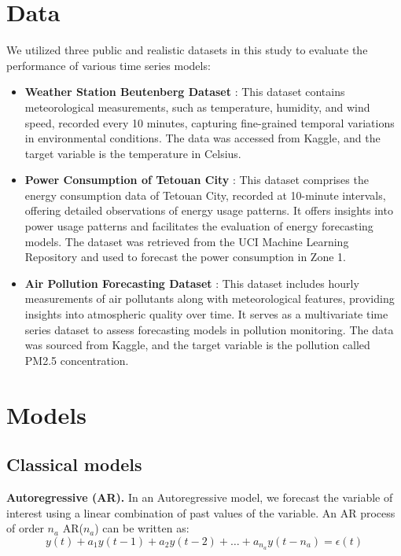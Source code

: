 \documentclass{scrartcl}
\begin{document}
\section{Data}
We utilized three public and realistic datasets in this study to evaluate the performance of various time series models:
\begin{itemize}
    \item \textbf{Weather Station Beutenberg Dataset} \cite{weather2020}: This dataset contains meteorological measurements, such as temperature, humidity, and wind speed, recorded every 10 minutes, capturing fine-grained temporal variations in environmental conditions. The data was accessed from Kaggle, and the target variable is the temperature in Celsius. 
    
    \item \textbf{Power Consumption of Tetouan City} \cite{power_consumption_of_tetouan_city_849}: This dataset comprises the energy consumption data of Tetouan City, recorded at 10-minute intervals,  offering detailed observations of energy usage patterns. It offers insights into power usage patterns and facilitates the evaluation of energy forecasting models. The dataset was retrieved from the UCI Machine Learning Repository and used to forecast the power consumption in Zone 1.
    
    \item \textbf{Air Pollution Forecasting Dataset} \cite{kaggle_lstm_dataset}: This dataset includes hourly measurements of air pollutants along with meteorological features, providing insights into atmospheric quality over time. It serves as a multivariate time series dataset to assess forecasting models in pollution monitoring. The data was sourced from Kaggle, and the target variable is the pollution called PM2.5 concentration.
\end{itemize}


\section{Models}
\subsection{Classical models}
\textbf{Autoregressive (AR).}
In an Autoregressive model, we forecast the variable of interest using a linear combination of past values of the variable.
An AR process of order \( n_a \) AR(\( n_a \))  can be written as:
\[
y(t) + a_1 y(t-1) + a_2 y(t-2) + \dots + a_{n_a} y(t-{n_a}) = \epsilon(t)
\]
\end{document}
